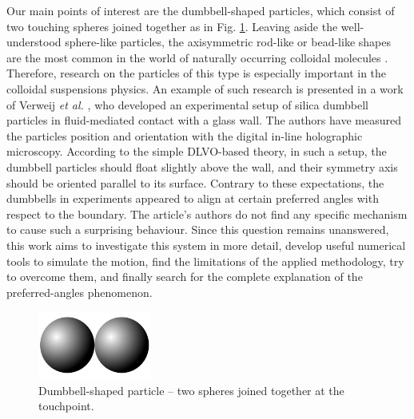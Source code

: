 \documentclass{master_thesis}
\begin{document}
Our main points of interest are the dumbbell-shaped particles, which consist of two touching spheres joined together as in Fig. \ref{fig:dumbbell_shape}. Leaving aside the well-understood sphere-like particles, the axisymmetric rod-like or bead-like shapes are the most common in the world of naturally occurring colloidal molecules \cite{hunter_1987,alberts_2003,clavano_2007}. Therefore, research on the particles of this type is especially important in the colloidal suspensions physics. An example of such research is presented in a work of Verweij \textit{et al.} \cite{verweij2021}, who developed an experimental setup of silica dumbbell particles in fluid-mediated contact with a glass wall. The authors have measured the particles position and orientation with the digital in-line holographic microscopy. According to the simple DLVO-based theory, in such a setup, the dumbbell particles should float slightly above the wall, and their symmetry axis should be oriented parallel to its surface. Contrary to these expectations, the dumbbells in experiments appeared to align at certain preferred angles with respect to the boundary. The article's authors do not find any specific mechanism to cause such a surprising behaviour. Since this question remains unanswered, this work aims to investigate this system in more detail, develop useful numerical tools to simulate the motion, find the limitations of the applied methodology, try to overcome them, and finally search for the complete explanation of the preferred-angles phenomenon.

\begin{figure}[h]
    \centering
    \includegraphics[width=0.33\textwidth]{figures/dumbbell_shape.png}
    \caption{Dumbbell-shaped particle -- two spheres joined together at the touchpoint.}
    \label{fig:dumbbell_shape}
\end{figure}
\end{document}
